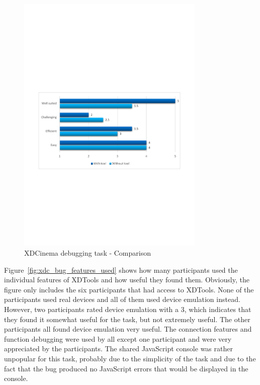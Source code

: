 \begin{figure}[H]
  \centering
    \includegraphics[width=0.8\textwidth]{images/charts/xdc_bug_comparison.pdf}
	\caption[xdc-bug: Comparison]{XDCinema debugging task - Comparison}
	\label{fig:xdc_bug_comparison}
\end{figure}

Figure~\ref{fig:xdc_bug_features_used} shows how many participants used the individual features of XDTools and how useful they found them. Obviously, the figure only includes the six participants that had access to XDTools. None of the participants used real devices and all of them used device emulation instead. However, two participants rated device emulation with a 3, which indicates that they found it somewhat useful for the task, but not extremely useful. The other participants all found device emulation very useful. The connection features and function debugging were used by all except one participant and were very appreciated by the participants. The shared JavaScript console was rather unpopular for this task, probably due to the simplicity of the task and due to the fact that the bug produced no JavaScript errors that would be displayed in the console.

